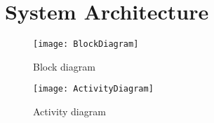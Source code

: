 \chapter{System Architecture}

\begin{figure}[H]
\centering
\texttt{[image: BlockDiagram]}
\caption{Block diagram}
\label{fig:BlockDiagram}
\end{figure}


\begin{figure}[H]
\centering
\texttt{[image: ActivityDiagram]}
\caption{Activity diagram}
\label{fig:ActivityDiagram}
\end{figure}